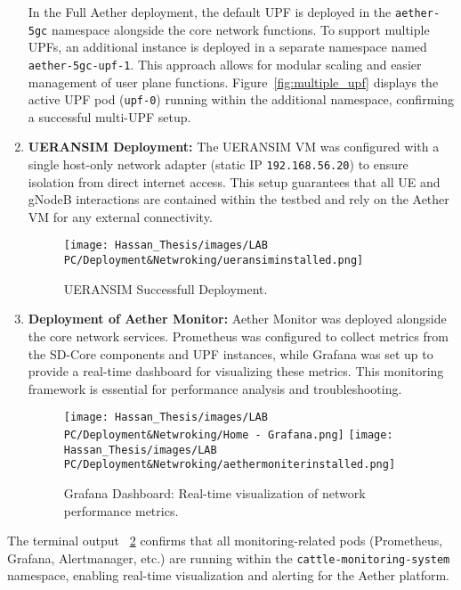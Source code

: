 \begin{enumerate}
In the Full Aether deployment, the default UPF is deployed in the \texttt{aether-5gc} namespace alongside the core network functions. To support multiple UPFs, an additional instance is deployed in a separate namespace named \texttt{aether-5gc-upf-1}. This approach allows for modular scaling and easier management of user plane functions. Figure~\ref{fig:multiple_upf} displays the active UPF pod (\texttt{upf-0}) running within the additional namespace, confirming a successful multi-UPF setup.

    \item \textbf{UERANSIM Deployment:}  
    The UERANSIM VM was configured with a single host-only network adapter (static IP \texttt{192.168.56.20}) to ensure isolation from direct internet access. This setup guarantees that all UE and gNodeB interactions are contained within the testbed and rely on the Aether VM for any external connectivity.

    \begin{figure}[H]
        \centering
        \texttt{[image: Hassan\_Thesis/images/LAB PC/Deployment\&Netwroking/ueransiminstalled.png]}
        \caption{UERANSIM Successfull Deployment.}
        \label{fig:ueransim_status}
    \end{figure}

    \item \textbf{Deployment of Aether Monitor:}  
    Aether Monitor was deployed alongside the core network services. Prometheus was configured to collect metrics from the SD-Core components and UPF instances, while Grafana was set up to provide a real-time dashboard for visualizing these metrics. This monitoring framework is essential for performance analysis and troubleshooting.
    \begin{figure}[H]
        \centering
        \texttt{[image: Hassan\_Thesis/images/LAB PC/Deployment\&Netwroking/Home - Grafana.png]}
        \texttt{[image: Hassan\_Thesis/images/LAB PC/Deployment\&Netwroking/aethermoniterinstalled.png]}
        \caption{Grafana Dashboard: Real-time visualization of network performance metrics.}
        \label{fig:grafana_dashboard}
    \end{figure}
\end{enumerate}

 The terminal output ~\ref{fig:grafana_dashboard} confirms that all monitoring-related pods (Prometheus, Grafana, Alertmanager, etc.) are running within the \texttt{cattle-monitoring-system} namespace, enabling real-time visualization and alerting for the Aether platform.

